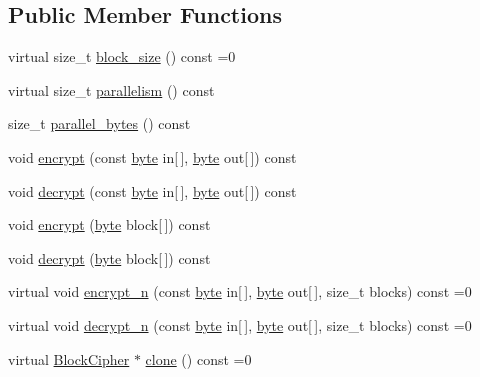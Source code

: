 \subsection*{Public Member Functions}
\begin{DoxyCompactItemize}
\item 
virtual size\-\_\-t \hyperlink{classBotan_1_1BlockCipher_ae5e91c5b169252e67f466f6b6321a41e}{block\-\_\-size} () const =0
\item 
virtual size\-\_\-t \hyperlink{classBotan_1_1BlockCipher_a635a1c3ed1084be78cf1b9e655ab1465}{parallelism} () const 
\item 
size\-\_\-t \hyperlink{classBotan_1_1BlockCipher_ae53ef2711f464a55a016abdf8cdd1895}{parallel\-\_\-bytes} () const 
\item 
void \hyperlink{classBotan_1_1BlockCipher_afc6eef96ad8cd8a824a170cb1c8b65d4}{encrypt} (const \hyperlink{namespaceBotan_a7d793989d801281df48c6b19616b8b84}{byte} in\mbox{[}$\,$\mbox{]}, \hyperlink{namespaceBotan_a7d793989d801281df48c6b19616b8b84}{byte} out\mbox{[}$\,$\mbox{]}) const 
\item 
void \hyperlink{classBotan_1_1BlockCipher_a3396e6bbf04686f0f1b4a7f9e72216f0}{decrypt} (const \hyperlink{namespaceBotan_a7d793989d801281df48c6b19616b8b84}{byte} in\mbox{[}$\,$\mbox{]}, \hyperlink{namespaceBotan_a7d793989d801281df48c6b19616b8b84}{byte} out\mbox{[}$\,$\mbox{]}) const 
\item 
void \hyperlink{classBotan_1_1BlockCipher_a20f03e5a6439dda86646e99c3cb5e3a8}{encrypt} (\hyperlink{namespaceBotan_a7d793989d801281df48c6b19616b8b84}{byte} block\mbox{[}$\,$\mbox{]}) const 
\item 
void \hyperlink{classBotan_1_1BlockCipher_a4257b50030b77f92ee6d3716fd8597cb}{decrypt} (\hyperlink{namespaceBotan_a7d793989d801281df48c6b19616b8b84}{byte} block\mbox{[}$\,$\mbox{]}) const 
\item 
virtual void \hyperlink{classBotan_1_1BlockCipher_a16a7005967a910407703c2899bd73ccf}{encrypt\-\_\-n} (const \hyperlink{namespaceBotan_a7d793989d801281df48c6b19616b8b84}{byte} in\mbox{[}$\,$\mbox{]}, \hyperlink{namespaceBotan_a7d793989d801281df48c6b19616b8b84}{byte} out\mbox{[}$\,$\mbox{]}, size\-\_\-t blocks) const =0
\item 
virtual void \hyperlink{classBotan_1_1BlockCipher_a6ea709632f78d833484a4d67de25e1a8}{decrypt\-\_\-n} (const \hyperlink{namespaceBotan_a7d793989d801281df48c6b19616b8b84}{byte} in\mbox{[}$\,$\mbox{]}, \hyperlink{namespaceBotan_a7d793989d801281df48c6b19616b8b84}{byte} out\mbox{[}$\,$\mbox{]}, size\-\_\-t blocks) const =0
\item 
virtual \hyperlink{classBotan_1_1BlockCipher}{Block\-Cipher} $\ast$ \hyperlink{classBotan_1_1BlockCipher_a9feaf7c1bfb5279a1652c849054e033c}{clone} () const =0
\end{DoxyCompactItemize}


